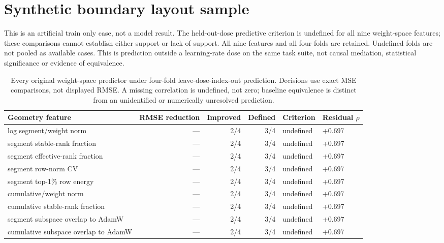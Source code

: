 \documentclass[11pt]{article}
\newcommand{\CorrectedGeometryBridgeFinding}{The held-out-dose predictive criterion is undefined for all nine weight-space features; these comparisons cannot establish either support or lack of support. All nine features and all four folds are retained. Undefined folds are not pooled as available cases. This is prediction outside a learning-rate dose on the same task suite, not causal mediation, statistical significance or evidence of equivalence.}
\newcommand{\CorrectedGeometryBridgeTable}{%
\begin{table}[t]
\centering\small
\begin{tabular}{lrrrll}\toprule
Geometry feature & RMSE reduction & Improved & Defined & Criterion & Residual $\rho$ \\
\midrule
log segment/weight norm & --- & 2/4 & 3/4 & undefined & +0.697 \\
segment stable-rank fraction & --- & 2/4 & 3/4 & undefined & +0.697 \\
segment effective-rank fraction & --- & 2/4 & 3/4 & undefined & +0.697 \\
segment row-norm CV & --- & 2/4 & 3/4 & undefined & +0.697 \\
segment top-1\% row energy & --- & 2/4 & 3/4 & undefined & +0.697 \\
cumulative/weight norm & --- & 2/4 & 3/4 & undefined & +0.697 \\
cumulative stable-rank fraction & --- & 2/4 & 3/4 & undefined & +0.697 \\
segment subspace overlap to AdamW & --- & 2/4 & 3/4 & undefined & +0.697 \\
cumulative subspace overlap to AdamW & --- & 2/4 & 3/4 & undefined & +0.697 \\
\bottomrule\end{tabular}
\caption{Every original weight-space predictor under four-fold leave-dose-index-out prediction. Decisions use exact MSE comparisons, not displayed RMSE. A missing correlation is undefined, not zero; baseline equivalence is distinct from an unidentified or numerically unresolved prediction.}
\label{tab:corrected-bridge}
\end{table}%
}
\begin{document}
\section*{Synthetic boundary layout sample}
This is an artificial train only case, not a model result.
\CorrectedGeometryBridgeFinding
\CorrectedGeometryBridgeTable
\end{document}
